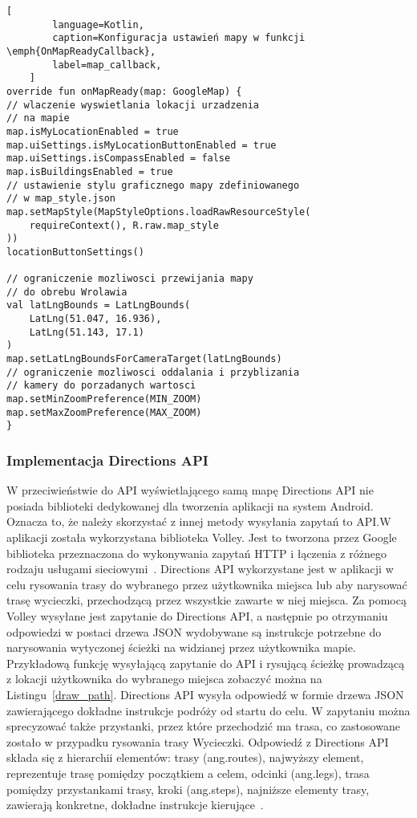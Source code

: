     \vspace{1cm}
    \begin{lstlisting}[
        language=Kotlin, 
        caption=Konfiguracja ustawień mapy w funkcji \emph{OnMapReadyCallback}, 
        label=map_callback,
    ]
override fun onMapReady(map: GoogleMap) {
// wlaczenie wyswietlania lokacji urzadzenia
// na mapie
map.isMyLocationEnabled = true
map.uiSettings.isMyLocationButtonEnabled = true
map.uiSettings.isCompassEnabled = false
map.isBuildingsEnabled = true
// ustawienie stylu graficznego mapy zdefiniowanego
// w map_style.json
map.setMapStyle(MapStyleOptions.loadRawResourceStyle(
    requireContext(), R.raw.map_style
))
locationButtonSettings()

// ograniczenie mozliwosci przewijania mapy
// do obrebu Wrolawia
val latLngBounds = LatLngBounds(
    LatLng(51.047, 16.936),
    LatLng(51.143, 17.1)
)
map.setLatLngBoundsForCameraTarget(latLngBounds)
// ograniczenie mozliwosci oddalania i przyblizania
// kamery do porzadanych wartosci
map.setMinZoomPreference(MIN_ZOOM)
map.setMaxZoomPreference(MAX_ZOOM)
}
    \end{lstlisting}

    \subsubsection{Implementacja Directions API}
    W przeciwieństwie do API wyświetlającego samą mapę Directions API nie posiada biblioteki dedykowanej dla tworzenia aplikacji na system Android. Oznacza to, że należy skorzystać z innej metody
    wysyłania zapytań to API.\@ W aplikacji została wykorzystana biblioteka Volley. Jest to tworzona przez Google biblioteka przeznaczona do wykonywania zapytań HTTP i łączenia z różnego rodzaju usługami
    sieciowymi~\cite{VOLLEY}. Directions API wykorzystane jest w aplikacji w celu rysowania trasy do wybranego przez użytkownika miejsca lub aby narysować trasę wycieczki, przechodzącą przez wszystkie
    zawarte w niej miejsca. Za pomocą Volley wysyłane jest zapytanie do Directions API, a następnie po otrzymaniu odpowiedzi w postaci drzewa JSON wydobywane są instrukcje potrzebne do narysowania
    wytyczonej ścieżki na widzianej przez użytkownika mapie. Przykładową funkcję wysyłającą zapytanie do API i rysującą ścieżkę prowadzącą z lokacji użytkownika do wybranego miejsca zobaczyć można
    na Listingu~\ref{draw_path}. Directions API wysyła odpowiedź w formie drzewa JSON zawierającego dokładne instrukcje podróży od startu do celu. W zapytaniu można sprecyzować także przystanki,
    przez które przechodzić ma trasa, co zastosowane zostało w przypadku rysowania trasy Wycieczki. Odpowiedź z Directions API składa się z hierarchii elementów: trasy (ang.\@ routes), najwyższy element,
    reprezentuje trasę pomiędzy początkiem a celem, odcinki (ang.\@ legs), trasa pomiędzy przystankami trasy, kroki (ang.\@ steps), najniższe elementy trasy, zawierają konkretne, dokładne instrukcje 
    kierujące~\cite{ROUTES}.

